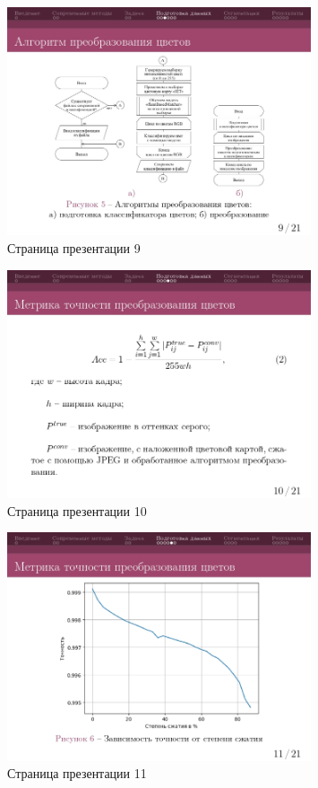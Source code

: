 \documentclass[14pt, a4paper]{extreport}
\begin{document}
	\begin{figure}[h!]
		\centering
		\includegraphics[width = 0.8\textwidth]{image/процентовка1_page-0009}	
		\caption{Страница презентации 9}
	\end{figure}
	\begin{figure}[h!]
		\centering
		\includegraphics[width = 0.8\textwidth]{image/процентовка1_page-0010}	
		\caption{Страница презентации 10}
	\end{figure}
	\begin{figure}[h!]
		\centering
		\includegraphics[width = 0.8\textwidth]{image/процентовка1_page-0011}	
		\caption{Страница презентации 11}
	\end{figure}
\end{document}
